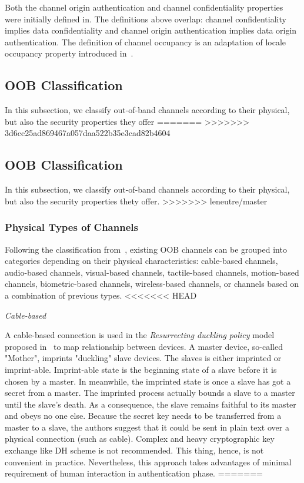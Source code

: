 Both the channel origin authentication and channel confidentiality properties were initially defined in\cite{Mausch94}. The definitions above overlap: channel confidentiality implies data confidentiality and channel origin authentication implies data origin authentication. The definition of channel occupancy is an adaptation of locale occupancy property introduced in~\cite{Thayer:2010aa}.

\subsection{OOB Classification}

In this subsection, we classify out-of-band channels according to their physical, but also the security properties they offer
=======
>>>>>>> 3d6cc25ad869467a057daa522b35e3cad82b4604

\subsection{OOB Classification}

In this subsection, we classify out-of-band channels according to their physical, but also the security properties thety offer. 
>>>>>>> leneutre/master

\subsubsection{Physical Types of Channels}

Following the classification from~\cite{KhanPathanbook}, existing OOB channels can be grouped into categories depending on their  physical characteristics: cable-based channels, audio-based channels, visual-based channels, tactile-based channels, motion-based channels, biometric-based channels, wireless-based channels, or channels based on a combination of previous types.
<<<<<<< HEAD
 

\emph{Cable-based}

A cable-based connection is used in the \textit{Resurrecting duckling policy} model proposed in~\cite{Stajano:2000bs} to map relationship between devices. A master device, so-called "Mother", imprints "duckling" slave devices. The slaves is either imprinted or imprint-able. Imprint-able state is the beginning state of a slave before it is chosen by a master. In meanwhile, the imprinted state is once a slave has got a secret from a master. The imprinted process actually bounds a slave to a master until the slave's death. As a consequence, the slave remains faithful to its master and obeys no one else. Because the secret key needs to be transferred from a master to a slave, the authors suggest that it could be sent in plain text over a physical connection (such as cable). Complex and heavy cryptographic key exchange like DH scheme is not recommended. This thing, hence, is not convenient in practice. Nevertheless, this approach takes advantages of minimal requirement of human interaction in authentication phase.  
=======

